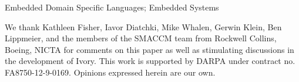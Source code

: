 \documentclass{sigplanconf}
\begin{document}


\keywords
Embedded Domain Specific Languages; Embedded Systems


















\acks

We thank Kathleen Fisher, Iavor Diatchki, Mike Whalen, Gerwin Klein,
Ben Lippmeier, and the
members of the SMACCM team from Rockwell Collins, Boeing, NICTA for comments on
this paper as well as stimulating discussions in the development of Ivory.  This
work is supported by DARPA under contract no. FA8750-12-9-0169.  Opinions
expressed herein are our own.



\balance


\appendix
\onecolumn
\clearpage
%




\end{document}
